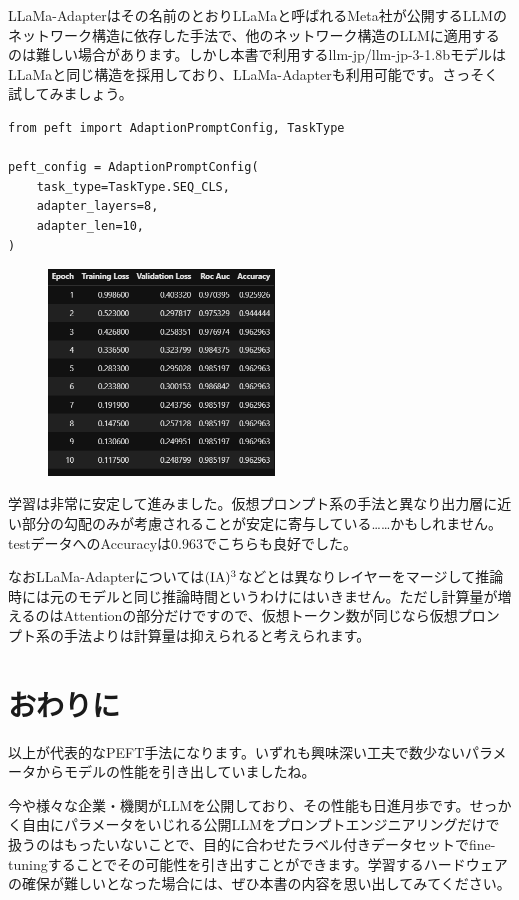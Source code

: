 \documentclass[a5paper,twoside,dvipdfmx]{jsarticle}
\begin{document}
LLaMa-Adapterはその名前のとおりLLaMaと呼ばれるMeta社が公開するLLMのネットワーク構造に依存した手法で、他のネットワーク構造のLLMに適用するのは難しい場合があります。しかし本書で利用するllm-jp/llm-jp-3-1.8bモデルはLLaMaと同じ構造を採用しており、LLaMa-Adapterも利用可能です。さっそく試してみましょう。

\begin{lstlisting}
from peft import AdaptionPromptConfig, TaskType

peft_config = AdaptionPromptConfig(
    task_type=TaskType.SEQ_CLS,
    adapter_layers=8,
    adapter_len=10,
)
\end{lstlisting}



\begin{figure}[h]
  \centering
  \includegraphics[width=60mm]{../C105Fig/gray/llama_adapter_train.png}
 \end{figure} 

学習は非常に安定して進みました。仮想プロンプト系の手法と異なり出力層に近い部分の勾配のみが考慮されることが安定に寄与している……かもしれません。testデータへのAccuracyは0.963でこちらも良好でした。

なおLLaMa-Adapterについては$\rm{(IA)^3}$などとは異なりレイヤーをマージして推論時には元のモデルと同じ推論時間というわけにはいきません。ただし計算量が増えるのはAttentionの部分だけですので、仮想トークン数が同じなら仮想プロンプト系の手法よりは計算量は抑えられると考えられます。

\newpage

\section{おわりに}

以上が代表的なPEFT手法になります。いずれも興味深い工夫で数少ないパラメータからモデルの性能を引き出していましたね。

今や様々な企業・機関がLLMを公開しており、その性能も日進月歩です。せっかく自由にパラメータをいじれる公開LLMをプロンプトエンジニアリングだけで扱うのはもったいないことで、目的に合わせたラベル付きデータセットでfine-tuningすることでその可能性を引き出すことができます。学習するハードウェアの確保が難しいとなった場合には、ぜひ本書の内容を思い出してみてください。
\end{document}
